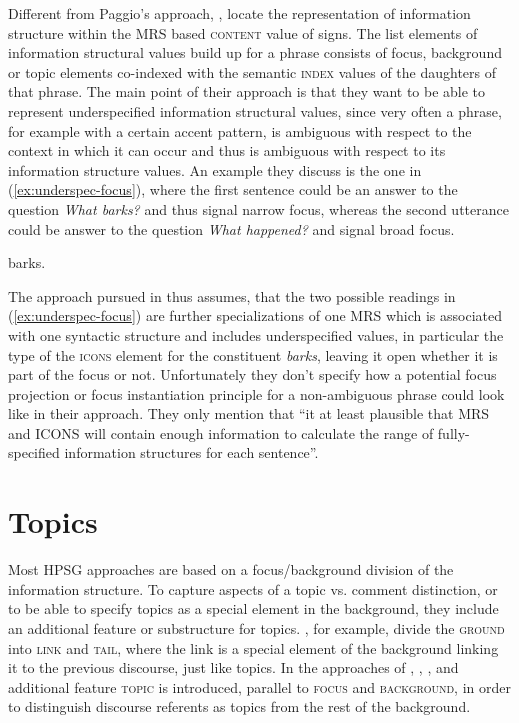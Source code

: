 \documentclass[output=paper]{langsci/langscibook}
\begin{document}
Different from Paggio's approach, \cite{song2018},
\cite{song-bender:2012} locate the representation of information
structure within the MRS based \textsc{content} value of signs. The
list elements of information structural values build up for a phrase
consists of focus, background or topic elements co-indexed with the
semantic \textsc{index} values of the daughters of that phrase.  The
main point of their approach is that they want to be able to represent
underspecified information structural values, since very often a
phrase, for example with a certain accent pattern, is ambiguous with
respect to the context in which it can occur and thus is ambiguous
with respect to its information structure values.  An example they
discuss is the one in (\ref{ex:underspec-focus}), where the first
sentence could be an answer to the question \textit{What barks?} and
thus signal narrow focus, whereas the second utterance could be answer
to the question \textit{What happened?} and signal broad focus.
\begin{exe}
  \ex\label{ex:underspec-focus}
  \begin{xlist}
     barks.
  \end{xlist}
\end{exe}
The approach pursued in \cite{song-bender:2012} thus assumes, that the
two possible readings in (\ref{ex:underspec-focus}) are further
specializations of one MRS which is associated with one syntactic
structure and includes underspecified values, in particular the type
of the \textsc{icons} element for the constituent \textit{barks},
leaving it open whether it is part of the focus or not.  Unfortunately
they don't specify how a potential focus projection or focus
instantiation principle for a non-ambiguous phrase could look like in
their approach. They only mention that ``it at least plausible that
MRS and ICONS will contain enough information to calculate the range
of fully-specified information structures for each sentence''.

\section{Topics}
\label{sec:topic}

Most HPSG approaches are based on a focus/background division of the
information structure. To capture aspects of a topic vs. comment
distinction, or to be able to specify topics as a special element in
the background, they include an additional feature or substructure for
topics. \cite{EV96a}, for example, divide the \textsc{ground} into
\textsc{link} and \textsc{tail}, where the link is a special element
of the background linking it to the previous discourse, just like
topics. In the approaches of \cite{deKuthy2002a},
\cite{song-bender:2012}, \cite{Paggio2009a-u}, and additional feature
\textsc{topic} is introduced, parallel to \textsc{focus} and
\textsc{background}, in order to distinguish discourse referents as
topics from the rest of the background.
\end{document}
